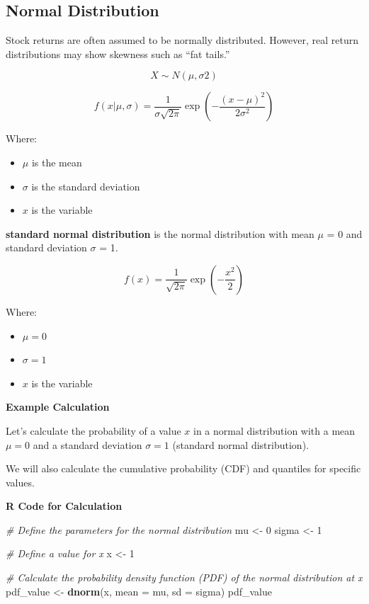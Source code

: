 \documentclass[
]{book}
\newenvironment{Shaded}{\begin{snugshade}}{\end{snugshade}}
\newcommand{\AttributeTok}[1]{\textcolor[rgb]{0.13,0.29,0.53}{#1}}
\newcommand{\CommentTok}[1]{\textcolor[rgb]{0.56,0.35,0.01}{\textit{#1}}}
\newcommand{\DecValTok}[1]{\textcolor[rgb]{0.00,0.00,0.81}{#1}}
\newcommand{\FunctionTok}[1]{\textcolor[rgb]{0.13,0.29,0.53}{\textbf{#1}}}
\newcommand{\NormalTok}[1]{#1}
\newcommand{\OtherTok}[1]{\textcolor[rgb]{0.56,0.35,0.01}{#1}}
\providecommand{\tightlist}{%
  \setlength{\itemsep}{0pt}\setlength{\parskip}{0pt}}
\begin{document}
\hypertarget{normal-distribution}{%
\subsection{Normal Distribution}\label{normal-distribution}}

Stock returns are often assumed to be normally distributed. However,
real return distributions may show skewness such as ``fat tails.''

\[X∼N(μ,σ2)\]

\[
f(x | \mu, \sigma) = \frac{1}{\sigma \sqrt{2\pi}} \exp\left(-\frac{(x - \mu)^2}{2\sigma^2}\right)
\]

Where:

\begin{itemize}
\tightlist
\item
  \(\mu\) is the mean
\item
  \(\sigma\) is the standard deviation
\item
  \(x\) is the variable
\end{itemize}

\textbf{standard normal distribution} is the normal distribution with
mean \(μ\) = 0 and standard deviation \(σ\) = 1.

\[
f(x) = \frac{1}{\sqrt{2\pi}} \exp\left(-\frac{x^2}{2}\right)
\]

Where:

\begin{itemize}
\tightlist
\item
  \(\mu = 0\)
\item
  \(\sigma = 1\)
\item
  \(x\) is the variable
\end{itemize}

\textbf{Example Calculation}

Let's calculate the probability of a value \(x\) in a normal
distribution with a mean \(\mu = 0\) and a standard deviation
\(\sigma = 1\) (standard normal distribution).

We will also calculate the cumulative probability (CDF) and quantiles
for specific values.

\textbf{R Code for Calculation}

\begin{Shaded}
\begin{Highlighting}[]
\CommentTok{\# Define the parameters for the normal distribution}
\NormalTok{mu }\OtherTok{\textless{}{-}} \DecValTok{0}
\NormalTok{sigma }\OtherTok{\textless{}{-}} \DecValTok{1}

\CommentTok{\# Define a value for x}
\NormalTok{x }\OtherTok{\textless{}{-}} \DecValTok{1}

\CommentTok{\# Calculate the probability density function (PDF) of the normal distribution at x}
\NormalTok{pdf\_value }\OtherTok{\textless{}{-}} \FunctionTok{dnorm}\NormalTok{(x, }\AttributeTok{mean =}\NormalTok{ mu, }\AttributeTok{sd =}\NormalTok{ sigma)}
\NormalTok{pdf\_value}
\end{Highlighting}
\end{Shaded}
\end{document}
